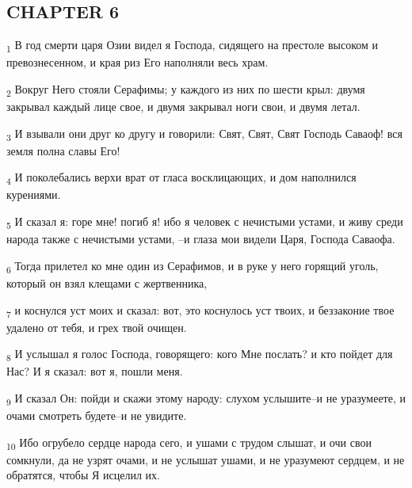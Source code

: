 \subsection{CHAPTER 6}
\begin{tcolorbox}
\textsubscript{1} В год смерти царя Озии видел я Господа, сидящего на престоле высоком и превознесенном, и края риз Его наполняли весь храм.
\end{tcolorbox}
\begin{tcolorbox}
\textsubscript{2} Вокруг Него стояли Серафимы; у каждого из них по шести крыл: двумя закрывал каждый лице свое, и двумя закрывал ноги свои, и двумя летал.
\end{tcolorbox}
\begin{tcolorbox}
\textsubscript{3} И взывали они друг ко другу и говорили: Свят, Свят, Свят Господь Саваоф! вся земля полна славы Его!
\end{tcolorbox}
\begin{tcolorbox}
\textsubscript{4} И поколебались верхи врат от гласа восклицающих, и дом наполнился курениями.
\end{tcolorbox}
\begin{tcolorbox}
\textsubscript{5} И сказал я: горе мне! погиб я! ибо я человек с нечистыми устами, и живу среди народа также с нечистыми устами, --и глаза мои видели Царя, Господа Саваофа.
\end{tcolorbox}
\begin{tcolorbox}
\textsubscript{6} Тогда прилетел ко мне один из Серафимов, и в руке у него горящий уголь, который он взял клещами с жертвенника,
\end{tcolorbox}
\begin{tcolorbox}
\textsubscript{7} и коснулся уст моих и сказал: вот, это коснулось уст твоих, и беззаконие твое удалено от тебя, и грех твой очищен.
\end{tcolorbox}
\begin{tcolorbox}
\textsubscript{8} И услышал я голос Господа, говорящего: кого Мне послать? и кто пойдет для Нас? И я сказал: вот я, пошли меня.
\end{tcolorbox}
\begin{tcolorbox}
\textsubscript{9} И сказал Он: пойди и скажи этому народу: слухом услышите--и не уразумеете, и очами смотреть будете--и не увидите.
\end{tcolorbox}
\begin{tcolorbox}
\textsubscript{10} Ибо огрубело сердце народа сего, и ушами с трудом слышат, и очи свои сомкнули, да не узрят очами, и не услышат ушами, и не уразумеют сердцем, и не обратятся, чтобы Я исцелил их.
\end{tcolorbox}

